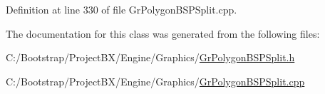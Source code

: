 Definition at line 330 of file GrPolygonBSPSplit.cpp.

The documentation for this class was generated from the following files:\begin{CompactItemize}
\item 
C:/Bootstrap/ProjectBX/Engine/Graphics/\hyperlink{_gr_polygon_b_s_p_split_8h}{GrPolygonBSPSplit.h}\item 
C:/Bootstrap/ProjectBX/Engine/Graphics/\hyperlink{_gr_polygon_b_s_p_split_8cpp}{GrPolygonBSPSplit.cpp}\end{CompactItemize}
